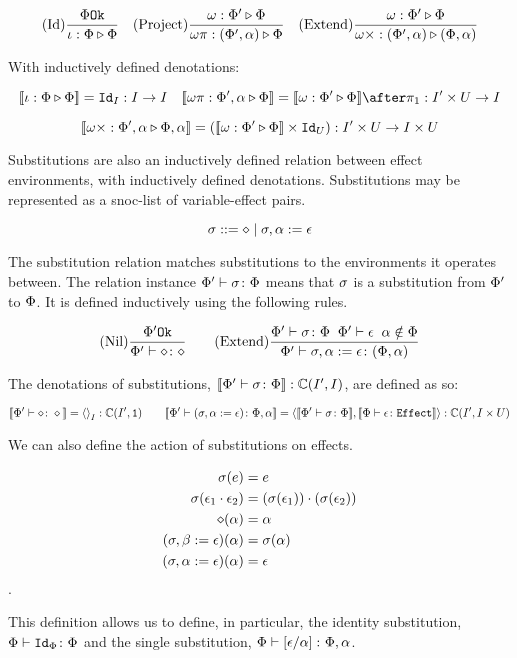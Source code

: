 \documentclass{Report}
\begin{document}
\[
    \treerule{Id}{\ok{\P}}{\wrel{\i}{\P}{\P}}
    \quad
    \treerule{Project}{\wrel{\w}{\P'}{\P}}{\wrel{\w\pi}{(\P', \a)}{\P}}
    \quad
    \treerule{Extend}{\wrel{\w}{\P'}{\P}}{\wrel{\w\x}{(\P', \a)}{(\P, \a)}}
\]

With inductively defined denotations: 

\[
    \deno{\wrel{\i}{\P}{\P}} = \Id{I}: I \rightarrow I
    \quad
    \deno{\wrel{\w\pi}{\P',\a}{\P}} = \deno{\wrelw{\P'}{\P}}\after \p: I'\times U\rightarrow I
\]

\[
    \deno{\wrel{\w\x}{\P',\a}{\P,\a}} = (\deno{\wrelw{\P'}{\P}}\times \Id{U}): I'\times U\rightarrow I\times U    
\]

Substitutions are also an inductively defined relation between effect environments, with inductively defined denotations. Substitutions may be represented as a snoc-list of variable-effect pairs.

\[
    \si \gens \nil \mid \si, \a \setto \e    
\]

The substitution relation matches substitutions to the environments it operates between. The relation instance $\typerelation{\P'}{\si}{\P}$ means that $\si$ is a substitution from $\P'$ to $\P$. It is defined inductively using the following rules.

\[
    \treerule{Nil}{\ok{\P'}}{\typerelation{\P'}{\nil}{\nil}}
    \quad\quad
    \treerule{Extend}{\typerelation{\P'}{\si}{\P}\s\s\wellformed{\P'}{\e}\s\s\a\notin\P}{\typerelation{\P'}{\si, \a \setto\e}{(\P, \a)}}
\]

The denotations of substitutions, $\deno{\typerelation{\P'}{\si}{\P}}: \cii$, are defined as so:

\[
    \deno{\typerelation{\P'}{\nil}{\nil}} = \term{I}: \C(I', \1)
    \quad\quad
    \deno{\typerelation{\P'}{(\si, \a\setto\e)}{\P,\a}} = \pr{\deno{\typerelation{\P'}{\si}{\P}}}{\deno{\typerelation{\P}{\e}{\effect}}}: \C(I', I\times U)
\]

We can also define the action of substitutions on effects.

\begin{align}
    \si(e) & = e \\
    \si(\e_1\dot\e_2) & = (\si(\e_1))\dot(\si(\e_2))\\
    \nil(\a) & = \a\\
    (\si, \b\setto \e)(\a) & = \si(\a) \\
    (\si, \a\setto \e)(\a) & =\e
\end{align}.

This definition allows us to define, in particular, the identity substitution,$\typerelation{\P}{\Id{\P}}{\P}$ and the single substitution, $\typerelation{\P}{\ssub{\a}{\e}}{\P,\a}$.
\end{document}
